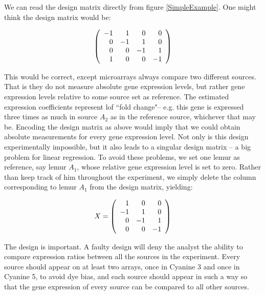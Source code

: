  
We can read the design matrix directly from figure \ref{SimpleExample}. One might think the design matrix would be:

\begin{eqnarray*}
  \left( \begin{array}{r r r r} 
  -1 & 1 & 0 & 0 \\
 0  & -1 & 1 & 0 \\
 0 & 0 &  -1 & 1 \\
 1 & 0 & 0 & -1 \\ 
\end{array} \right)
\end{eqnarray*}

This would be correct, except microarrays always compare two different sources. That is they do not measure absolute gene expression levels, but rather gene expression levels relative to some source set as reference. The estimated expression coefficients represent lof ``fold change"-- e.g. this gene is expressed three times as much in source $A_2$ as in the reference source, whichever that may be. Encoding the design matrix as above would imply that we could obtain absolute measurements for every gene expression level. Not only is this design experimentally impossible, but it also leads to a singular design matrix -- a big problem for linear regression. 
	To avoid these problems, we set one lemur as reference, say lemur $A_1$, whose relative gene expression level is set to zero. Rather than keep track of him throughout the experiment, we simply delete the column corresponding to lemur $A_1$ from the design matrix, yielding:

\begin{eqnarray}
X =  \left( \begin{array}{ r r  r} 
   1 & 0 & 0 \\
  -1 & 1 & 0 \\
  0 &  -1 & 1 \\
 0 & 0 & -1 \\ 
\end{array} \right)
\end{eqnarray}

The design is important. A faulty design will deny the analyst the ability to compare expression ratios between all the sources in the experiment. Every source should appear on at least two arrays, once in Cyanine 3 and once in Cyanine 5, to avoid dye bias, and each source should appear in such a way so that the gene expression of every source can be compared to all other sources. 


